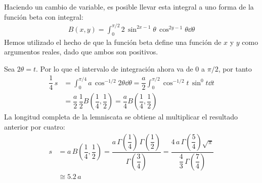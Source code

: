 Haciendo un cambio de variable, es posible llevar esta integral a uno forma de la función beta con integral:
\begin{align*}
B(x, y) = \int_{0}^{\pi/2} 2 \, \sin^{2x-1} \theta \, \cos^{2y-1} \theta \dd{\theta}
\end{align*}
Hemos utilizado el hecho de que la función beta define una función de $x$ y $y$ como argumentos reales, dado que ambos son positivos.
\par
Sea $2 \theta = t$. Por lo que el intervalo de integración ahora va de $0$ a $\pi/2$, por tanto
\begin{align*}
\dfrac{1}{4} \, s &= \int_{0}^{\pi/4} a \, \cos^{-1/2} 2 \theta \dd{\theta} = \dfrac{a}{2} \int_{0}^{\pi/2} \cos^{-1/2} t \, \sin^{0} t \dd{t} \\[1em]
&= \dfrac{a}{2} \, \dfrac{1}{2} B\left(\dfrac{1}{4}, \dfrac{1}{2} \right) = \dfrac{a}{4} B\left(\dfrac{1}{4}, \dfrac{1}{2} \right)
\end{align*}
La longitud completa de la lemniscata se obtiene al multiplicar el resultado anterior por cuatro:
\begin{align*}
s &= a \, B\left(\dfrac{1}{4}, \dfrac{1}{2} \right) = \dfrac{a \, \Gamma \left( \dfrac{1}{4} \right) \, \Gamma \left( \dfrac{1}{2} \right) }{\Gamma \left( \dfrac{3}{4} \right)} = \dfrac{4 \, a \, \Gamma \left( \dfrac{5}{4} \right) \sqrt{\pi}}{\dfrac{4}{3} \, \Gamma \left( \dfrac{7}{4} \right)} \\
&\cong 5.2 \,a
\end{align*}
\newpage
